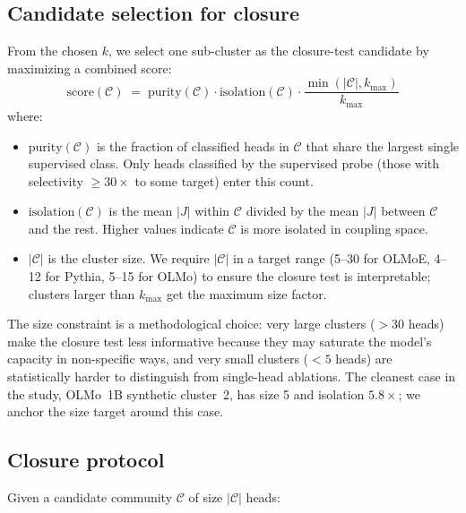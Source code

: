 \documentclass[11pt]{article}
\begin{document}
\subsection{Candidate selection for closure}
From the chosen $k$, we select one sub-cluster as the closure-test candidate
by maximizing a combined score:
\[
\text{score}(\mathcal{C}) \;=\;
   \text{purity}(\mathcal{C})
   \cdot \text{isolation}(\mathcal{C})
   \cdot \frac{\min(|\mathcal{C}|, k_\text{max})}{k_\text{max}}
\]
where:
\begin{itemize}
\item $\text{purity}(\mathcal{C})$ is the fraction of classified heads in
  $\mathcal{C}$ that share the largest single supervised class. Only heads
  classified by the supervised probe (those with selectivity $\geq 30\times$
  to some target) enter this count.
\item $\text{isolation}(\mathcal{C})$ is the mean $|J|$ within $\mathcal{C}$
  divided by the mean $|J|$ between $\mathcal{C}$ and the rest. Higher
  values indicate $\mathcal{C}$ is more isolated in coupling space.
\item $|\mathcal{C}|$ is the cluster size. We require $|\mathcal{C}|$ in a
  target range (5--30 for OLMoE, 4--12 for Pythia, 5--15 for OLMo) to
  ensure the closure test is interpretable; clusters larger than
  $k_\text{max}$ get the maximum size factor.
\end{itemize}

The size constraint is a methodological choice: very large clusters
($>30$ heads) make the closure test less informative because they may
saturate the model's capacity in non-specific ways, and very small
clusters ($<5$ heads) are statistically harder to distinguish from
single-head ablations. The cleanest case in the study, OLMo~1B synthetic
cluster~2, has size 5 and isolation $5.8\times$; we anchor the size target
around this case.

\subsection{Closure protocol}
\label{sec:closure-protocol}

Given a candidate community $\mathcal{C}$ of size $|\mathcal{C}|$ heads:
\end{document}
